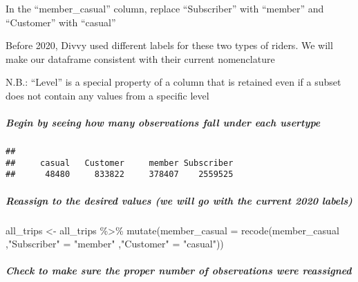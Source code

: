 \documentclass[
]{article}
\newenvironment{Shaded}{\begin{snugshade}}{\end{snugshade}}
\newcommand{\AttributeTok}[1]{\textcolor[rgb]{0.77,0.63,0.00}{#1}}
\newcommand{\FunctionTok}[1]{\textcolor[rgb]{0.00,0.00,0.00}{#1}}
\newcommand{\NormalTok}[1]{#1}
\newcommand{\OtherTok}[1]{\textcolor[rgb]{0.56,0.35,0.01}{#1}}
\newcommand{\SpecialCharTok}[1]{\textcolor[rgb]{0.00,0.00,0.00}{#1}}
\newcommand{\StringTok}[1]{\textcolor[rgb]{0.31,0.60,0.02}{#1}}
\begin{document}
In the ``member\_casual'' column, replace ``Subscriber'' with ``member''
and ``Customer'' with ``casual''

Before 2020, Divvy used different labels for these two types of riders.
We will make our dataframe consistent with their current nomenclature

N.B.: ``Level'' is a special property of a column that is retained even
if a subset does not contain any values from a specific level

\hypertarget{begin-by-seeing-how-many-observations-fall-under-each-usertype}{%
\subparagraph{Begin by seeing how many observations fall under each
usertype}\label{begin-by-seeing-how-many-observations-fall-under-each-usertype}}

\begin{Shaded}
\end{Shaded}

\begin{verbatim}
## 
##     casual   Customer     member Subscriber 
##      48480     833822     378407    2559525
\end{verbatim}

\hypertarget{reassign-to-the-desired-values-we-will-go-with-the-current-2020-labels}{%
\subparagraph{Reassign to the desired values (we will go with the
current 2020
labels)}\label{reassign-to-the-desired-values-we-will-go-with-the-current-2020-labels}}

\begin{Shaded}
\begin{Highlighting}[]
\NormalTok{all\_trips }\OtherTok{\textless{}{-}}\NormalTok{  all\_trips }\SpecialCharTok{\%\textgreater{}\%} 
  \FunctionTok{mutate}\NormalTok{(}\AttributeTok{member\_casual =} \FunctionTok{recode}\NormalTok{(member\_casual}
\NormalTok{                           ,}\StringTok{"Subscriber"} \OtherTok{=} \StringTok{"member"}
\NormalTok{                           ,}\StringTok{"Customer"} \OtherTok{=} \StringTok{"casual"}\NormalTok{))}
\end{Highlighting}
\end{Shaded}

\hypertarget{check-to-make-sure-the-proper-number-of-observations-were-reassigned}{%
\subparagraph{Check to make sure the proper number of observations were
reassigned}\label{check-to-make-sure-the-proper-number-of-observations-were-reassigned}}
\end{document}
